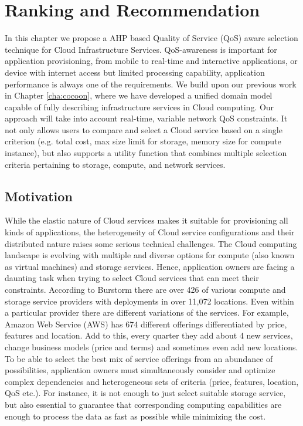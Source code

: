 \chapter{Ranking and Recommendation} 
\label{cha:AHP}
In this chapter we propose a AHP based Quality of Service (QoS) aware selection technique for Cloud Infrastructure Services.
QoS-awareness is important for application provisioning, from mobile to real-time and interactive applications, or device with internet access but limited processing capability, application performance is always one of the requirements.
We build upon our previous work in Chapter \ref{cha:cocoon}, where we have developed a unified domain model capable of fully describing infrastructure services in Cloud computing. 
Our approach will take into account real-time, variable network QoS constraints.
It not only allows users to compare and select a Cloud service based on a single criterion (e.g. total cost, max size limit for storage, memory size for compute instance), but also supports 
a utility function that combines multiple selection criteria pertaining to storage, compute, and network services.

\section{Motivation}
\label{sec:TheProblemOfSelectingOptimalServiceConfiguration}
While the elastic nature of Cloud services makes it suitable for provisioning all kinds of applications, the heterogeneity of Cloud service configurations and their distributed nature raises some serious technical challenges. 
The Cloud computing landscape is evolving with multiple and diverse options for compute (also known as virtual machines) and storage services. Hence, application owners are facing a daunting task when trying to select Cloud services that can meet their constraints. According to Burstorm \cite{Burstorm} there are over 426 of various compute and storage service providers with deployments in over 11,072 locations. Even within a particular provider there are different variations of the services. For example, Amazon Web Service (AWS) has 674 different offerings differentiated by price, features and location. Add to this, every quarter they add about 4 new services, change business models (price and terms) and sometimes even add new locations. To be able to select the best mix of service offerings from an abundance of possibilities, application owners must simultaneously consider and optimize complex dependencies and heterogeneous sets of criteria (price, features, location, QoS etc.). For instance, it is not enough to just select suitable storage service, but also essential to guarantee that corresponding computing capabilities are enough to process the data as fast as possible while minimizing the cost.

